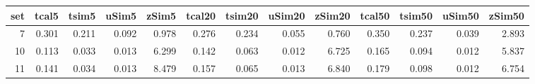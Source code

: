 
\begin{tabular}{r|r|r|r|r|r|r|r|r|r|r|r|r}
\hline
set & tcal5 & tsim5 & uSim5 & zSim5 & tcal20 & tsim20 & uSim20 & zSim20 & tcal50 & tsim50 & uSim50 & zSim50\\
\hline
7 & 0.301 & 0.211 & 0.092 & 0.978 & 0.276 & 0.234 & 0.055 & 0.760 & 0.350 & 0.237 & 0.039 & 2.893\\
\hline
10 & 0.113 & 0.033 & 0.013 & 6.299 & 0.142 & 0.063 & 0.012 & 6.725 & 0.165 & 0.094 & 0.012 & 5.837\\
\hline
11 & 0.141 & 0.034 & 0.013 & 8.479 & 0.157 & 0.065 & 0.013 & 6.840 & 0.179 & 0.098 & 0.012 & 6.754\\
\hline
\end{tabular}
